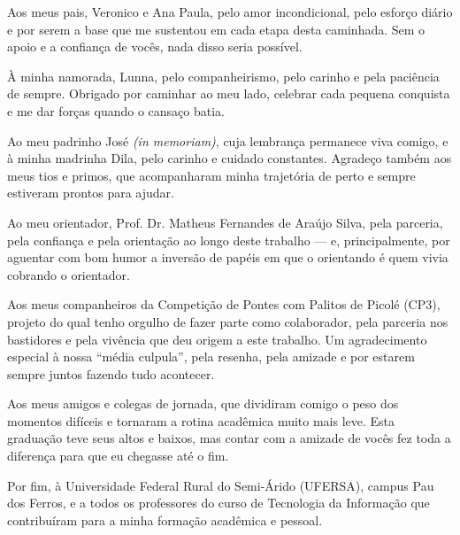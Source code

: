 Aos meus pais, Veronico e Ana Paula, pelo amor incondicional, pelo esforço diário e por serem a base que me sustentou em cada etapa desta caminhada. Sem o apoio e a confiança de vocês, nada disso seria possível.

À minha namorada, Lunna, pelo companheirismo, pelo carinho e pela paciência de sempre. Obrigado por caminhar ao meu lado, celebrar cada pequena conquista e me dar forças quando o cansaço batia.

Ao meu padrinho José \textit{(in memoriam)}, cuja lembrança permanece viva comigo, e à minha madrinha Dila, pelo carinho e cuidado constantes. Agradeço também aos meus tios e primos, que acompanharam minha trajetória de perto e sempre estiveram prontos para ajudar.

Ao meu orientador, Prof. Dr. Matheus Fernandes de Araújo Silva, pela parceria, pela confiança e pela orientação ao longo deste trabalho — e, principalmente, por aguentar com bom humor a inversão de papéis em que o orientando é quem vivia cobrando o orientador.

Aos meus companheiros da Competição de Pontes com Palitos de Picolé (CP3), projeto do qual tenho orgulho de fazer parte como colaborador, pela parceria nos bastidores e pela vivência que deu origem a este trabalho. Um agradecimento especial à nossa ``média culpula'', pela resenha, pela amizade e por estarem sempre juntos fazendo tudo acontecer.

Aos meus amigos e colegas de jornada, que dividiram comigo o peso dos momentos difíceis e tornaram a rotina acadêmica muito mais leve. Esta graduação teve seus altos e baixos, mas contar com a amizade de vocês fez toda a diferença para que eu chegasse até o fim.

Por fim, à Universidade Federal Rural do Semi-Árido (UFERSA), campus Pau dos Ferros, e a todos os professores do curso de Tecnologia da Informação que contribuíram para a minha formação acadêmica e pessoal.